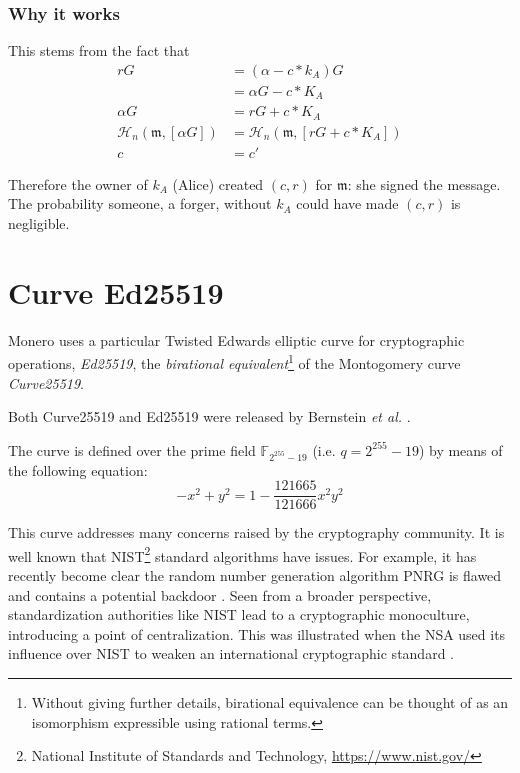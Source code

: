 \subsubsection*{Why it works}

This stems from the fact that
\begin{align*}
  	 r G &= (\alpha - c*k_A) G \\
  	  	 &= \alpha G - c*K_A \\
\alpha G &= r G + c*K_A \\
\mathcal{H}_n(\mathfrak{m},[\alpha G]) &= \mathcal{H}_n(\mathfrak{m},[r G + c*K_A]) \\
       c &= c'
\end{align*}

Therefore the owner of $k_A$ (Alice) created $(c,r)$ for $\mathfrak{m}$: she signed the message. The probability someone, a forger, without $k_A$ could have made $(c,r)$ is negligible.


\section{Curve Ed25519}
\label{Ed25519_section}

Monero uses a particular Twisted Edwards elliptic curve for cryptographic operations, {\em Ed25519}, the {\em birational equivalent}\footnote{\label{birational_note}Without giving further details, birational equivalence can be thought of as an isomorphism expressible using rational terms.} 
of the Montogomery curve {\em Curve25519}.

Both Curve25519 and Ed25519 were released by Bernstein {\em et al.} \cite{Bernstein2008, Bernstein2012, Bernstein2007}.

The curve is defined over the prime field \(\mathbb{F}_{2^{255} - 19} \) (i.e. $q = 2^{255}-19$) by means of the following equation:\\
\[ -x^2 + y^2 = 1 - \frac{121665}{121666} x^2 y^2 \]

This curve addresses many concerns raised by the cryptography community. It is well known that NIST\footnote{\label{NIST_note}National Institute of Standards and Technology, \url{https://www.nist.gov/}} 
standard algorithms have issues. For example, it has recently become clear the random number generation algorithm PNRG is flawed and contains a potential backdoor \cite{hales2014nsa}. Seen from a broader perspective, standardization authorities like NIST lead to a cryptographic monoculture, introducing a point of centralization. This was illustrated when the NSA used its influence over NIST to weaken an international cryptographic standard \cite{NSA-NIST}.
\\

